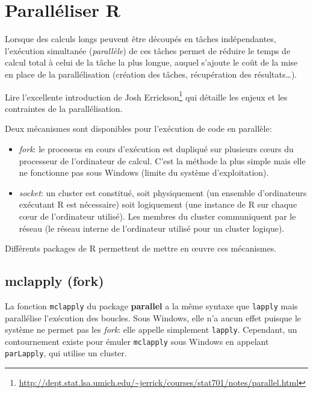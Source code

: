 \documentclass[
  12pt,
  french,
  a4paper,
  extrafontsizes,onecolumn,openright
  ]{memoir}
\providecommand{\tightlist}{%
  \setlength{\itemsep}{0pt}\setlength{\parskip}{0pt}}
\begin{document}
\section{Paralléliser R}\label{sec:parallel}

Lorsque des calculs longs peuvent être découpés en tâches indépendantes, l'exécution simultanée (\emph{parallèle}) de ces tâches permet de réduire le temps de calcul total à celui de la tâche la plus longue, auquel s'ajoute le coût de la mise en place de la parallélisation (création des tâches, récupération des résultats\ldots).

Lire l'excellente introduction de Josh Errickson\footnote{\url{http://dept.stat.lsa.umich.edu/~jerrick/courses/stat701/notes/parallel.html}} qui détaille les enjeux et les contraintes de la parallélisation.

Deux mécanismes sont disponibles pour l'exécution de code en parallèle:

\begin{itemize}
\tightlist
\item
  \emph{fork}: le processus en cours d'exécution est dupliqué sur plusieurs cœurs du processeur de l'ordinateur de calcul.
  C'est la méthode la plus simple mais elle ne fonctionne pas sous Windows (limite du système d'exploitation).
\item
  \emph{socket}: un cluster est constitué, soit physiquement (un ensemble d'ordinateurs exécutant R est nécessaire) soit logiquement (une instance de R sur chaque cœur de l'ordinateur utilisé).
  Les membres du cluster communiquent par le réseau (le réseau interne de l'ordinateur utilisé pour un cluster logique).
\end{itemize}

Différents packages de R permettent de mettre en œuvre ces mécanismes.

\subsection{mclapply (fork)}\label{mclapply-fork}

La fonction \texttt{mclapply} du package \textbf{parallel} a la même syntaxe que \texttt{lapply} mais parallélise l'exécution des boucles.
Sous Windows, elle n'a aucun effet puisque le système ne permet pas les \emph{fork}: elle appelle simplement \texttt{lapply}.
Cependant, un contournement existe pour émuler \texttt{mclapply} sous Windows en appelant \texttt{parLapply}, qui utilise un cluster.

\scriptsize
\end{document}
